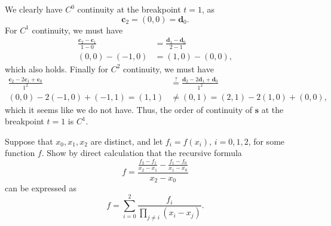 \begin{solution}{2.3}
    We clearly have $C^0$ continuity at the breakpoint $t = 1$, as
    \begin{equation*}
        \mathbf{c}_2 = (0, 0) = \mathbf{d}_0.
    \end{equation*}
    For $C^1$ continuity, we must have
    \begin{align*}
        \frac{\mathbf{c}_2 - \mathbf{c}_1}{1 - 0} &= \frac{\mathbf{d}_1 - \mathbf{d}_0}{2 - 1} \\
        (0, 0) - (-1, 0) &= (1, 0) - (0, 0),
    \end{align*}
    which also holds.
    Finally for $C^2$ continuity, we must have
    \begin{align*}
        \frac{\mathbf{c}_2 - 2 \mathbf{c}_1 + \mathbf{c}_0}{1^2} &\stackrel{?}{=} \frac{\mathbf{d}_2 - 2 \mathbf{d}_1 + \mathbf{d}_0}{1^2} \\
        (0, 0) - 2(-1, 0) + (-1, 1) = (1, 1) &\neq (0, 1) = (2, 1) - 2(1, 0) + (0, 0),
    \end{align*}
    which it seems like we do not have.
    Thus, the order of continuity of $\mathbf{s}$ at the breakpoint $t = 1$ is $C^1$.
\end{solution}

\begin{exercise}{3.1}
    Suppose that $x_0, x_1, x_2$ are distinct, and let $f_i = f(x_i)$, $i = 0, 1, 2$, for some function $f$.
    Show by direct calculation that the recursive formula
    \begin{equation*}
        [x_0, x_1, x_2]f =
        \frac{
            \frac{f_2 - f_1}{x_2 - x_1}
            - \frac{f_1 - f_0}{x_1 - x_0}
        }{x_2 - x_0}
    \end{equation*}
    can be expressed as
    \begin{equation*}
        [x_0, x_1, x_2]f = \sum_{i=0}^{2} \frac{f_i}{\prod_{j \neq i} (x_i - x_j)}.
    \end{equation*}
\end{exercise}

